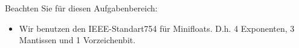 Beachten Sie für diesen Aufgabenbereich:
\begin{itemize}
	\item Wir benutzen den IEEE-Standart754 für Minifloats. D.h. 4 Exponenten, 3 Mantissen und 1 Vorzeichenbit.
\end{itemize}